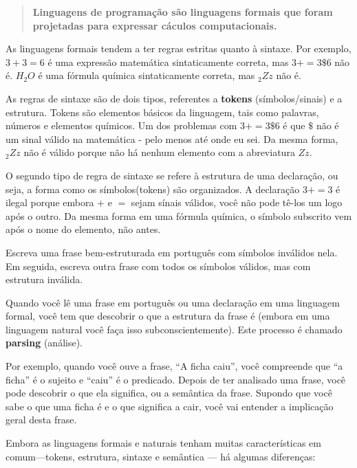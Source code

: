 \documentclass[10pt]{book}
\begin{document}
\begin{quote}
{\bf Linguagens de programação são linguagens formais que foram
projetadas para expressar cáculos computacionais.}
\end{quote}

As linguagens formais tendem a ter regras estritas quanto à sintaxe. Por exemplo,
$3 + 3 = 6$ é uma expressão matemática sintaticamente correta, mas 
$3 + = 3 \mbox{\$} 6$ não é.
$H_2O$ é uma fórmula química
sintaticamente correta, mas $_2Zz$ não é.

As regras de sintaxe são de dois tipos, referentes a {\bf tokens} (símbolos/sinais) e
a estrutura. Tokens são elementos básicos da linguagem, tais como
palavras, números e elementos químicos. Um dos problemas com
$3 + = 3 \mbox{\$} 6$ é que \( \$ \) não é um sinal válido na matemática -
pelo menos até onde eu sei. Da mesma forma, $_2Zz$ não é válido porque
não há nenhum elemento com a abreviatura $Zz$.

O segundo tipo de regra de sintaxe se refere à estrutura de uma
declaração, ou seja, a forma como os símbolos(tokens) são organizados. A declaração
$3 + = 3$ é ilegal porque embora $+$ e $=$ sejam
sínais válidos, você não pode tê-los um logo após o outro. Da mesma forma
em uma fórmula química, o símbolo subscrito vem após o nome do elemento, não
antes.

\begin{exercise}

Escreva uma frase bem-estruturada
em português com símbolos inválidos nela. Em seguida, escreva outra frase
com todos os símbolos válidos, mas com estrutura inválida.

\end{exercise}

Quando você lê uma frase em português ou uma declaração em uma linguagem
formal, você tem que descobrir o que a estrutura da frase é
(embora em uma linguagem natural você faça isso subconscientemente). Este
processo é chamado {\bf parsing} (análise).

Por exemplo, quando você ouve a frase, ``A ficha caiu'', você
compreende que ``a ficha'' é o sujeito e ``caiu'' é o
predicado. Depois de ter analisado uma frase, você pode descobrir o que ela
significa, ou a semântica da frase. Supondo que você sabe
o que uma ficha é e o que significa a cair, você vai entender a
implicação geral desta frase.

Embora as linguagens formais e naturais tenham muitas características em
comum---tokens, estrutura, sintaxe e semântica --- há algumas
diferenças:
\end{document}
